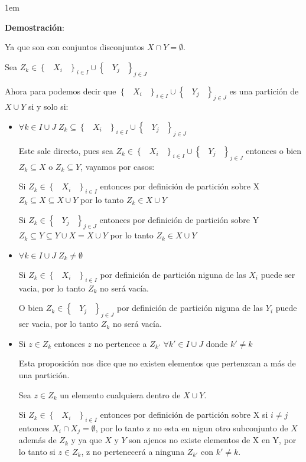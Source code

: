 \documentclass[12pt, fleqn]{article}                             %
\newenvironment{SmallIndentation}[1][0.75em]                    %
    {\begin{adjustwidth}{#1}{}\begin{footnotesize}}                 %
    {\end{footnotesize}\end{adjustwidth}}                           %
\DeclareMathOperator \Space {\quad}                             %
\DeclareMathOperator \MiniSpace {\;}                            %
\newcommand{\Set}[1]{\left\{ \MiniSpace #1 \MiniSpace \right\}} %
\begin{document}
    \begin{SmallIndentation}[1em]
        \textbf{Demostración}:
        
        Ya que son con conjuntos disconjuntos $X \cap Y = \emptyset$.

        Sea $Z_k \in \Set{X_i}_{i \in I} \cup \Set{Y_j}_{j \in J}$

        Ahora para podemos decir que $\Set{X_i}_{i \in I} \cup \Set{Y_j}_{j \in J}$ es una partición de $X \cup Y$
        si y solo si:

        \begin{itemize}
            \item $\forall k \in I \cup J \; Z_k \subseteq \Set{X_i}_{i \in I} \cup \Set{Y_j}_{j \in J}$

                Este sale directo, pues sea $Z_k \in \Set{X_i}_{i \in I} \cup \Set{Y_j}_{j \in J}$
                entonces o bien $Z_k \subseteq X$ o $Z_k \subseteq Y$, vayamos por casos:

                Si $Z_k \in \Set{X_i}_{i \in I}$ entonces por definición de partición sobre X
                $Z_k \subseteq X \subseteq X \cup Y$ por lo tanto $Z_k \in X \cup Y$

                Si $Z_k \in \Set{Y_j}_{j \in J}$ entonces por definición de partición sobre Y
                $Z_k \subseteq Y \subseteq Y \cup X = X \cup Y$ por lo tanto $Z_k \in X \cup Y$

            \item $\forall k \in I \cup J \; Z_k \neq \emptyset$

                Si $Z_k \in \Set{X_i}_{i \in I}$ por definición de partición niguna de las $X_i$ puede
                ser vacia, por lo tanto $Z_k$ no será vacía.

                O bien $Z_k \in \Set{Y_j}_{j \in J}$ por definición de partición niguna de las $Y_i$ puede
                ser vacia, por lo tanto $Z_k$ no será vacía.

            \item Si $z \in Z_k$ entonces $z$ no pertenece a $Z_{k'}$ $\forall k' \in I \cup J$ donde $k' \neq k$

                Esta proposición nos dice que no existen elementos que pertenzcan a más de una partición.

                Sea $z \in Z_k$ un elemento cualquiera dentro de $X \cup Y$.

                Si $Z_k \in \Set{X_i}_{i \in I}$ entonces por definición de partición sobre X 
                si $i \neq j$ entonces $X_i \cap X_j = \emptyset$, por lo tanto z no esta en nigun otro subconjunto
                de $X$ además de $Z_k$ y ya que $X$ y $Y$ son ajenos no existe elementos de X en Y, por lo tanto
                si $z \in Z_k$, z no pertenecerá a ninguna $Z_{k'}$ con $k' \neq k$.


\end{itemize}
\end{SmallIndentation}
\end{document}
